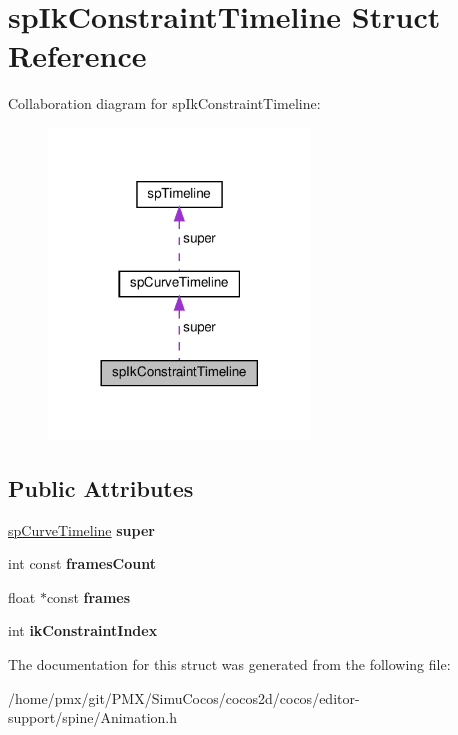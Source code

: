 \hypertarget{structspIkConstraintTimeline}{}\section{sp\+Ik\+Constraint\+Timeline Struct Reference}
\label{structspIkConstraintTimeline}


Collaboration diagram for sp\+Ik\+Constraint\+Timeline\+:
\nopagebreak
\begin{figure}[H]
\begin{center}
\leavevmode
\includegraphics[width=197pt]{structspIkConstraintTimeline__coll__graph}
\end{center}
\end{figure}
\subsection*{Public Attributes}
\begin{DoxyCompactItemize}
\item 
\mbox{\label{structspIkConstraintTimeline_abbee8656ea39fb234a966ea9722c4b84}} 
\hyperlink{structspCurveTimeline}{sp\+Curve\+Timeline} {\bfseries super}
\item 
\mbox{\label{structspIkConstraintTimeline_a4a2ea464cf59929ea7ff0566d63da4e8}} 
int const {\bfseries frames\+Count}
\item 
\mbox{\label{structspIkConstraintTimeline_a25df66270f166eb9238d77ffb29161bf}} 
float $\ast$const {\bfseries frames}
\item 
\mbox{\label{structspIkConstraintTimeline_a8f74976dc1ddfc1af61834d944022895}} 
int {\bfseries ik\+Constraint\+Index}
\end{DoxyCompactItemize}


The documentation for this struct was generated from the following file\+:\begin{DoxyCompactItemize}
\item 
/home/pmx/git/\+P\+M\+X/\+Simu\+Cocos/cocos2d/cocos/editor-\/support/spine/Animation.\+h\end{DoxyCompactItemize}

